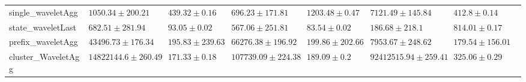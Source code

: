 \begin{table}[!htbp]
{\begin{tabular}{llllllll}
			single\_waveletAgg & $1050.34 \pm 200.21$ & $439.32 \pm 0.16$ & $696.23 \pm 171.81$ & $1203.48 \pm 0.47$ & $7121.49 \pm 145.84$ & $412.8 \pm 0.14$ \\ 
			state\_waveletLast & $682.51 \pm 281.94$ & $\mathbf{93.05 \pm 0.02}$ & $\mathbf{567.06 \pm 251.81}$ & $\mathbf{83.54 \pm 0.02}$ & $\mathbf{186.68 \pm 218.1}$ & $814.01 \pm 0.17$ \\ 
			prefix\_waveletAgg & $43496.73 \pm 176.34$ & $195.83 \pm 239.63$ & $66276.38 \pm 196.92$ & $199.86 \pm 202.66$ & $7953.67 \pm 248.62$ & $\mathbf{179.54 \pm 156.01}$ \\ 
			cluster\_WaveletAgg & $14822144.6 \pm 260.49$ & $171.33 \pm 0.18$ & $107739.09 \pm 224.38$ & $189.09 \pm 0.2$ & $92412515.94 \pm 259.41$ & $325.06 \pm 0.29$ \\ 
			

\end{tabular}}
\end{table}

